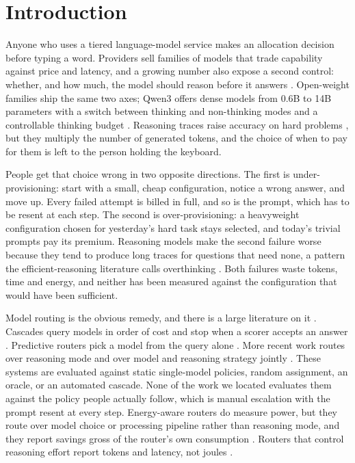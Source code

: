 \section{Introduction}
\label{sec:introduction}

Anyone who uses a tiered language-model service makes an allocation decision
before typing a word. Providers sell families of models that trade
capability against price and latency, and a growing number also expose a
second control: whether, and how much, the model should reason before it
answers \cite{openai_reasoning,anthropic_effort,google_thinking}. Open-weight
families ship the same two axes; Qwen3 offers dense models from 0.6B to 14B
parameters with a switch between thinking and non-thinking modes and a
controllable thinking budget \cite{qwen3}. Reasoning traces raise accuracy on
hard problems \cite{wei2022cot,deepseek2025r1}, but they multiply the number
of generated tokens, and the choice of when to pay for them is left to the
person holding the keyboard.

People get that choice wrong in two opposite directions. The first is
under-provisioning: start with a small, cheap configuration, notice a wrong
answer, and move up. Every failed attempt is billed in full, and so is the
prompt, which has to be resent at each step. The second is
over-provisioning: a heavyweight configuration chosen for yesterday's hard
task stays selected, and today's trivial prompts pay its premium. Reasoning
models make the second failure worse because they tend to produce long traces
for questions that need none, a pattern the efficient-reasoning literature
calls overthinking \cite{sui2025stopoverthinking,alomrani2025reasoningbudget}.
Both failures waste tokens, time and energy, and neither has been measured
against the configuration that would have been sufficient.

Model routing is the obvious remedy, and there is a large literature on it
\cite{moslem2026routingsurvey}. Cascades query models in order of cost and
stop when a scorer accepts an answer \cite{chen2023frugalgpt,aggarwal2024automix}.
Predictive routers pick a model from the query alone
\cite{ding2024hybridllm,ong2024routellm}. More recent work routes over
reasoning mode \cite{zhang2025synapseroute,lee2026dart} and over model and
reasoning strategy jointly \cite{pan2026routetoreason}. These systems are
evaluated against static single-model policies, random assignment, an oracle,
or an automated cascade. None of the work we located evaluates them against
the policy people actually follow, which is manual escalation with the prompt
resent at every step. Energy-aware routers do measure power, but they route
over model choice or processing pipeline rather than reasoning mode, and they
report savings gross of the router's own consumption
\cite{ziller2026greenserv,li2026ecothink}. Routers that control reasoning
effort report tokens and latency, not joules \cite{lee2026dart}.

